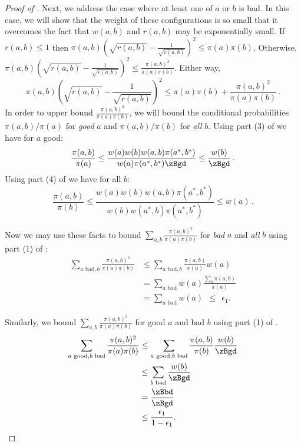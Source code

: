 \begin{proof}[Proof of ]
Next, we address the case where at least one of $a$ or $b$ is bad.  In this case, we
will show that the weight of these configurations is so small that
it overcomes the fact that $w(a,b)$ and $r(a,b)$ may be exponentially small.  
If $r(a,b)\leq 1$ then
$\pi(a,b)\left(\sqrt{r(a,b)}-\frac{1}{\sqrt{r(a,b)}}\right)^2\leq
\pi(a)\pi(b)$.  Otherwise,
$\pi(a,b)\left(\sqrt{r(a,b)}-\frac{1}{\sqrt{r(a,b)}}\right)^2\leq
\frac{\pi(a,b)^2}{\pi(a)\pi(b)}.$  Either way,
\[\pi(a,b)\left(\sqrt{r(a,b)}-\frac{1}{\sqrt{r(a,b)}}\right)^2\leq
\pi(a)\pi(b) + \frac{\pi(a,b)^2}{\pi(a)\pi(b)}\,.\]
In order to upper bound $\frac{\pi(a,b)^2}{\pi(a)\pi(b)}$, we will
bound the conditional probabilities $\pi(a,b)/\pi(a)$ for \emph{good} 
$a$ and $\pi(a,b)/\pi(b)$ for \emph{all} $b$.  Using part (3) of  
we have for $a$ good:
$$\frac{\pi(a,b)}{\pi(a)} \leq \frac{w(a)w(b)w(a,b)\pi(a^*,b^*)}{w(a)\pi(a^*,b^*)\zBgd} \leq \frac{w(b)}{\zBgd}\,.$$
Using part (4) of  we have for all $b$:
$$\frac{\pi(a,b)}{\pi(b)} \leq \frac{w(a)w(b)w(a,b)\pi(a^*,b^*)}{w(b)w(a^*,b)\pi(a^*,b^*)} \leq w(a)\,.$$
 
\noindent Now we may use these facts to bound $\sum_{a,b} 
\frac{\pi(a,b)^2}{\pi(a)\pi(b)}$ for \emph{bad} $a$ and \emph{all} $b$ 
using part (1) of :
 \begin{align*}
   \sum_{a \text{ bad},b} \frac{\pi(a,b)^2}{\pi(a)\pi(b)}
      &\leq  \sum_{a \text{ bad},b} \frac{\pi(a,b)}{\pi(a)}w(a) \\ 
   &= \sum_{a \text{ bad}} w(a) \frac{ \sum_b \pi(a,b)}{\pi(a)} \\ 
 &= \sum_{a \text{ bad}} w(a)~~ \leq ~~\epsilon_1.
 \end{align*}
 
\noindent Similarly, we bound $\sum_{a,b} \frac{\pi(a,b)^2}{\pi(a)\pi(b)}$ 
for good $a$ and bad $b$ using part (1) of .
  \begin{align*}
    \sum_{a \text{ good},b\text{ bad}} \frac{\pi(a,b)^2}{\pi(a)\pi(b)}
    &\leq \sum_{a \text{ good},b\text{ bad}}
    \frac{\pi(a,b)}{\pi(b)}\frac{w(b)}{\zBgd}\\
    &\leq \sum_{b\text{ bad}} \frac{w(b)}{\zBgd}\\
    &= \frac{\zBbd}{\zBgd}\\
    &\leq \frac{\epsilon_1}{1- \epsilon_1}.
 \end{align*}
 

\end{proof}
